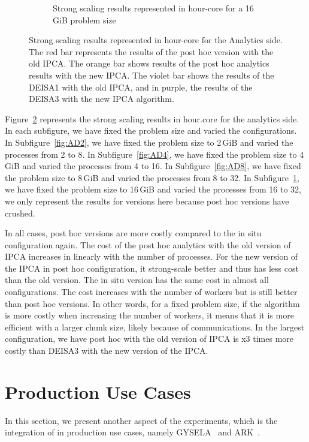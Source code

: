 \begin{figure}[h]
\begin{subfigure}[b]{0.4\textwidth}
         \caption{Strong scaling results represented in hour-core for a 16\,GiB problem size}
         \label{fig:AD16}
     \end{subfigure}
        \caption{Strong scaling results represented in hour-core for the Analytics side. The red bar represents the results of the post hoc version with the old IPCA. The orange bar shows results of the post hoc analytics results with the new IPCA. The violet bar shows the results of the DEISA1 with the old IPCA, and in purple, the results of the DEISA3 with the new IPCA algorithm.}
        \label{fig:strongAnalytics}
\end{figure}


Figure~\ref{fig:strongAnalytics} represents the strong scaling results in  hour.core for the analytics side. In each subfigure, we have fixed the problem size and varied the configurations. 
In Subfigure~\ref{fig:AD2}, we have fixed the problem size to 2\,GiB and varied the processes from 2 to 8.
In Subfigure~\ref{fig:AD4}, we have fixed the problem size to 4\,GiB and varied the processes from 4 to 16.
In Subfigure~\ref{fig:AD8}, we have fixed the problem size to 8\,GiB and varied the processes from 8 to 32.
In Subfigure~\ref{fig:AD16}, we have fixed the problem size to 16\,GiB and varied the processes from 16 to 32, we only represent the results for \deisa versions here because post hoc versions have crushed.

In all cases, post hoc versions are more costly compared to the in situ configuration again.
The cost of the post hoc analytics with the old version of IPCA increases in linearly with the number of processes.%
For the new version of the IPCA in post hoc configuration, it strong-scale better and thus has less cost than the old version. 
The in situ version has the same cost in almost all configurations. The cost increases with the number of workers but is still better than post hoc versions. 
In other words, for a fixed problem size, if the algorithm is more costly when increasing the number of workers, it means that it is more efficient with a larger chunk size, likely because of communications.   
In the largest configuration, we have post hoc with the old version of IPCA is x3 times more costly than DEISA3 with the new version of the IPCA. 



\section{Production Use Cases}
In this section, we present another aspect of the experiments, which is the integration of \deisa in production use cases, namely GYSELA~\cite{Grandgirard_CPC2016, latu:hal-01719208-gysela, latu:hal-01834323-gysela, bigot:hal-01050322-gysela} and ARK~\cite{Padioleau_2019}.


